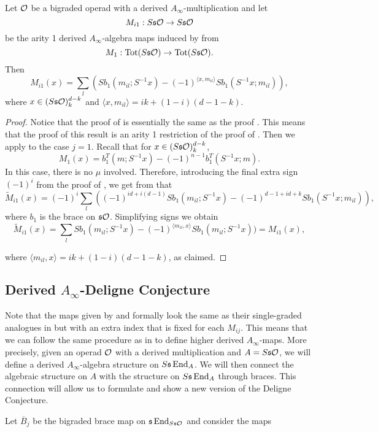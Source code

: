 \documentclass[Thesis.tex]{subfiles}
\begin{document}
\begin{corollary}\label{mi1}
Let ${\mathcal O}$ be a bigraded operad with a derived $A_\infty$-multiplication and let \[M_{i1}:S\mathfrak{s}{\mathcal O}\to S\mathfrak{s}{\mathcal O}\] be the arity 1 derived $A_\infty$-algebra maps induced by  from \[M_1:\operatorname{Tot}(S\mathfrak{s}{\mathcal O})\to \operatorname{Tot}(S\mathfrak{s}{\mathcal O}).\]
Then \[M_{i1}(x)= \sum_l (Sb_1(m_{il};S^{-1}x)-(-1)^{\langle x,m_{il}\rangle}Sb_1(S^{-1}x;m_{il})),\]
where $x\in (S\mathfrak{s}{\mathcal O})^{d-k}_k$ and $\langle x,m_{il}\rangle=ik+(1-i)(d-1-k)$.
\end{corollary}
\begin{proof}
Notice that the proof of  is essentially the same as the proof . This means that the proof of this result is an arity 1 restriction of the proof of . Then we apply  to the case $j=1$. Recall that for $x\in (S\mathfrak{s}{\mathcal O})^{d-k}_{k}$,
\[M_1(x)=b_1^T(m;S^{-1}x)-(-1)^{n-1}b_1^T(S^{-1}x;m).\]
 In this case, there is no $\mu$ involved. Therefore, introducing the final extra sign $(-1)^i$ from the proof of , we get from  that
\[\widetilde{M}_{i1}(x)=(-1)^i\sum_l((-1)^{id+i(d-1)} Sb_1(m_{il};S^{-1}x)-(-1)^{d-1+id+k}Sb_1(S^{-1}x;m_{il})),\] where $b_1$ is the brace on $\mathfrak{s}{\mathcal O}$. Simplifying signs we obtain
\[\widetilde{M}_{i1}(x)=\sum_l Sb_1(m_{il};S^{-1}x)-(-1)^{\langle  m_{il},x\rangle}Sb_1(m_{il};S^{-1}x))=M_{i1}(x),\]

where $\langle  m_{il},x\rangle=ik+(1-i)(d-1-k)$, as claimed.
\end{proof}

\subsection{Derived $A_\infty$-Deligne Conjecture}

Note that the maps given by  and  formally look the same as their single-graded analogues in  but with an extra index that is fixed for each $M_{ij}$. This means that we can follow the same procedure as in  to define higher derived $A_\infty$-maps. More precisely, given an operad ${\mathcal O}$ with a derived multiplication and $A=S\mathfrak{s}{\mathcal O}$, we will define a derived $A_\infty$-algebra structure on $S\mathfrak{s}\operatorname{End}_A$. We will then connect the algebraic structure on $A$ with the structure on $S\mathfrak{s}\operatorname{End}_A$ through braces. This connection will allow us to formulate and show a new version of the Deligne Conjecture.

Let $\overline{B}_j$ be the bigraded brace map on $\mathfrak{s}\operatorname{End}_{S\mathfrak{s}{\mathcal O}}$ and consider the maps
\end{document}

